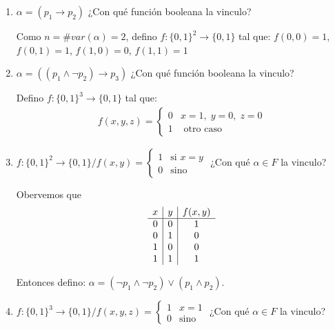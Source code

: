 \begin{enumerate}
    \item $\alpha = (p_1 \to p_2)$ ¿Con qué función booleana la vinculo?

        Como $n = \# var(\alpha) = 2$, defino $f: {\{ 0,1 \}}^{2} \to 
        \{ 0,1 \}$ tal que:
            $f(0,0) = 1$,
            $f(0,1) = 1$,
            $f(1,0) = 0$,
            $f(1,1) = 1$

    \item $\alpha = ((p_1 \wedge \neg p_2) \to p_3)$ 
        ¿Con qué función booleana la vinculo?

        Defino $f: {\{ 0,1 \}}^3 \to \{ 0,1 \}$ tal que:
       \begin{gather*}
            f(x,y,z) = \begin{cases}
                0 & x = 1, \; y=0, \; z=0 \\
                1 & \text{ otro caso}
            \end{cases} 
        \end{gather*} 

    \item $f: {\{ 0,1 \}}^2 \to \{ 0,1 \} / f(x,y) = \begin{cases} 
            1 & \text{si } x=y \\
            0 & \text{sino}
            \end{cases}$
        ¿Con qué $\alpha \in F$ la vinculo?

        Obervemos que
        \begin{gather*}
            \begin{array}{c | c | c}
                x & y & f(x,y) \\
                \hline 
                0 & 0 & 1 \\
                0 & 1 & 0 \\
                1 & 0 & 0 \\
                1 & 1 & 1
            \end{array}
        \end{gather*}

        Entonces defino:
        $\alpha = (\neg p_1 \wedge \neg p_2) \vee (p_1 \wedge p_2)$.

    \item $f: {\{ 0,1 \}}^3 \to \{ 0,1 \} / f(x,y,z) = \begin{cases}
            1 & x = 1 \\ 0 & \text{sino} \end{cases}$
        ¿Con qué $\alpha \in F$ la vinculo?


\end{enumerate}
